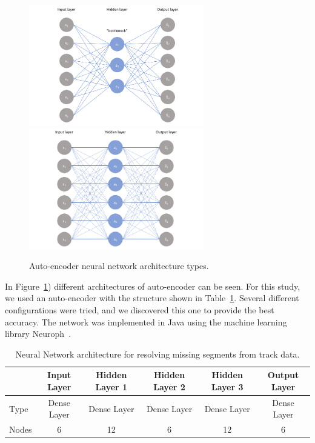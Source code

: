 \documentclass[12pt]{article}
\begin{document}
\begin{figure}[!ht]
\begin{center}
 \includegraphics[width=3.0in]{images/ae_nb.png}
 \includegraphics[width=3.0in]{images/ae_b.png}
\caption {Auto-encoder neural network architecture types.}
 \label{pic:autoencoders}
 \end{center}
\end{figure}

In Figure~\ref{pic:autoencoders}) different architectures of auto-encoder can be seen. For this study, we used 
an auto-encoder with the structure shown in Table~\ref{table:network}. Several different configurations were tried, and
we discovered this one to provide the best accuracy.
The network was implemented in Java using the machine learning library Neuroph~\cite{neuroph-2.98}. 

\begin{table}[!h]
\begin{center}
\begin{tabular}{|l|c|c|c|c|c|}
\hline
 & Input Layer & Hidden Layer 1 & Hidden Layer 2 & Hidden Layer 3 & Output Layer \\
\hline
\hline
Type & Dense Layer & Dense Layer &Dense Layer &Dense Layer &Dense Layer \\
\hline
Nodes & 6 & 12 & 6 & 12 & 6 \\
\hline
\end{tabular}
\end{center}
\caption{Neural Network architecture for resolving missing segments from track data.}
\label{table:network}
\end{table}
\end{document}
